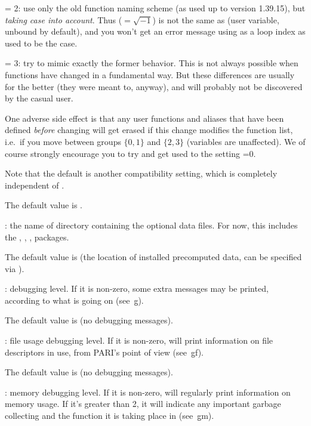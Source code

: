 \quad {} = 2: use only the old function naming scheme (as
used up to version 1.39.15), but \emph{taking case into account}. Thus
 (${}=\sqrt{-1}$) is not the same as  (user variable, unbound
by default), and you won't get an error message using  as a loop
index as used to be the case.

\quad {} = 3: try to mimic exactly the former behavior. This
is not always possible when functions have changed in a fundamental way.
But these differences are usually for the better (they were meant to,
anyway), and will probably not be discovered by the casual user.

One adverse side effect is that any user functions and aliases that have
been defined \emph{before} changing  will get erased if this
change modifies the function list, i.e.~if you move between groups
$\{0,1\}$ and $\{2,3\}$ (variables are unaffected). We of course strongly
encourage you to try and get used to the setting =0.

Note that the default  is another compatibility setting,
which is completely independent of .

The default value is .

: \label{se:def,datadir}the name of directory containing the optional data files. For now,
this includes the , , , 
packages.

The default value is \datadir (the location of installed precomputed data,
can be specified via ).

: \label{se:def,debug}debugging level. If it is non-zero, some extra messages may be printed,
according to what is going on (see~\b{g}).

The default value is  (no debugging messages).

: \label{se:def,debugfiles}file usage debugging level. If it is non-zero,  will print
information on file descriptors in use, from PARI's point of view
(see~\b{gf}).

The default value is  (no debugging messages).

: \label{se:def,debugmem}memory debugging level. If it is non-zero,  will regularly print
information on memory usage. If it's greater than 2, it will indicate any
important garbage collecting and the function it is taking place in
(see~\b{gm}).

